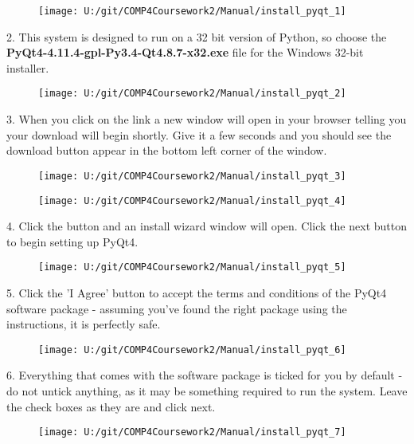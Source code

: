 \begin{figure}[H]
    \texttt{[image: U:/git/COMP4Coursework2/Manual/install\_pyqt\_1]}
\end{figure}

2. This system is designed to run on a 32 bit version of Python, so choose the \textbf{PyQt4-4.11.4-gpl-Py3.4-Qt4.8.7-x32.exe} file for the Windows 32-bit installer.

\begin{figure}[H]
    \texttt{[image: U:/git/COMP4Coursework2/Manual/install\_pyqt\_2]}
\end{figure}

3. When you click on the link a new window will open in your browser telling you your download will begin shortly. Give it a few seconds and you should see the download button appear in the bottom left corner of the window.

\begin{figure}[H]
    \texttt{[image: U:/git/COMP4Coursework2/Manual/install\_pyqt\_3]}
\end{figure}

\begin{figure}[H]
    \texttt{[image: U:/git/COMP4Coursework2/Manual/install\_pyqt\_4]}
\end{figure}

4. Click the button and an install wizard window will open. Click the next button to begin setting up PyQt4.

\begin{figure}[H]
    \texttt{[image: U:/git/COMP4Coursework2/Manual/install\_pyqt\_5]}
\end{figure}

5. Click the 'I Agree' button to accept the terms and conditions of the PyQt4 software package - assuming you've found the right package using the instructions, it is perfectly safe.

\begin{figure}[H]
    \texttt{[image: U:/git/COMP4Coursework2/Manual/install\_pyqt\_6]}
\end{figure}

6. Everything that comes with the software package is ticked for you by default - do not untick anything, as it may be something required to run the system. Leave the check boxes as they are and click next.

\begin{figure}[H]
    \texttt{[image: U:/git/COMP4Coursework2/Manual/install\_pyqt\_7]}
\end{figure}

